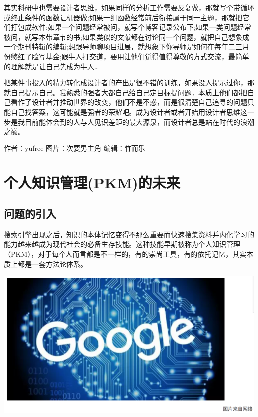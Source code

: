 \documentclass[]{book}
\begin{document}
其实科研中也需要设计者思维，如果同样的分析工作需要反复做，那就写个带循环或终止条件的函数让机器做;如果一组函数经常前后衔接属于同一主题，那就把它们打包成软件;如果一个问题经常被问，就写个博客记录公布下;如果一类问题经常被问，就写本带章节的书;如果类似的文献都在讨论同一个问题，就把自己想象成一个期刊特辑的编辑;想跟导师聊项目进展，就想象下你导师是如何在每年二三月份憋红了脸写基金;跟牛人打交道，要用让他们觉得值得尊敬的方式交流，最简单的理解就是让自己先成为牛人\ldots{}

把某件事投入的精力转化成设计者的产出是很不错的训练，如果没人提示过你，那就自己提示自己。我熟悉的强者大都自己给自己定目标提问题，本质上他们都把自己看作了设计者并推动世界的改变，他们不是不惑，而是很清楚自己追寻的问题只能自己找答案，这可能就是强者的荣耀吧。成为设计者或者开始用设计者思维这一步是我目前能体会到的人与人见识差距的最大源泉，而设计者总是站在时代的浪潮之巅。

作者：yufree
图片：次要男主角
编辑：竹而乐

\hypertarget{ux4e2aux4ebaux77e5ux8bc6ux7ba1ux7406pkmux7684ux672aux6765}{%
\section{个人知识管理(PKM)的未来}\label{ux4e2aux4ebaux77e5ux8bc6ux7ba1ux7406pkmux7684ux672aux6765}}

\hypertarget{ux95eeux9898ux7684ux5f15ux5165}{%
\subsection{问题的引入}\label{ux95eeux9898ux7684ux5f15ux5165}}

搜索引擎出现之后，知识的本体记忆变得不那么重要而快速搜集资料并内化学习的能力越来越成为现代社会的必备生存技能。这种技能早期被称为个人知识管理（PKM），对于每个人而言都是不一样的，有的崇尚工具，有的依托记忆，其实本质上都是一套方法论体系。

\includegraphics[width=8.33in]{images/gtd1}
\end{document}
